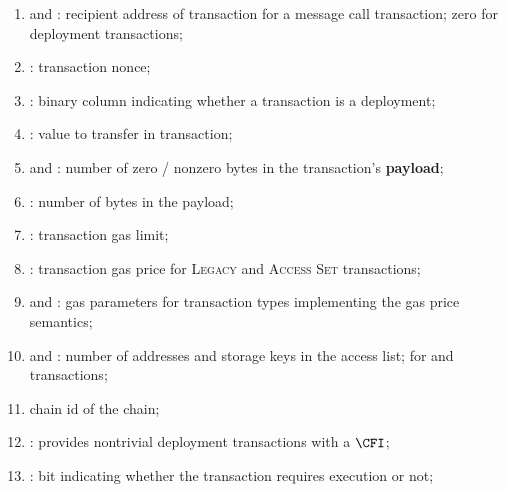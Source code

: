 \begin{enumerate}[resume]
	\item
		\txnDataRlpToAddrHi{} and
		\txnDataRlpToAddrLo{}:
		recipient address of transaction for a message call transaction;
		zero for deployment transactions;
	\item
		\txnDataRlpNonce{}:
		transaction nonce;
	\item
		\txnDataRlpIsDep{}:
		binary column indicating whether a transaction is a deployment;
	\item
		\txnDataRlpValue{}:
		value to transfer in transaction;
	\item
		\txnDataRlpNumberOfZeroBytes{} and
		\txnDataRlpNumberOfNonzeroBytes{}:
		number of zero / nonzero bytes in the transaction's \textbf{payload};
	\item
		\txnDataRlpDataSize{}:
		number of bytes in the payload;
	\item
		\txnDataRlpGasLimit{}:
		transaction gas limit;
	\item
		\txnDataRlpGasPrice{}:
		transaction gas price for
		\textsc{Legacy} and
		\textsc{Access Set} transactions;
	\item
		\txnDataRlpMaxPriorityFeePerGas{}  and
		\txnDataRlpMaxFeePerGas{}:
		gas parameters for transaction types implementing the
		\cite{EIP-1559} gas price semantics;
	\item
		\txnDataRlpNumberOfAccessListAddresses{} and
		\txnDataRlpNumberOfAccessListStorageKeys{}:
		number of addresses and storage keys in the access list;
		for \cite{EIP-2929} and \cite{EIP-2930} transactions;
	\item
		\txnDataRlpChainId{}
		chain id of the chain;
	\item
		\txnDataRlpCfi{}:
		provides nontrivial deployment transactions with a $\CFI$;
	\item
		\txnDataRlpRequiresEvmExecution{}:
		bit indicating whether the transaction requires \evm{} execution or not;
\end{enumerate}
